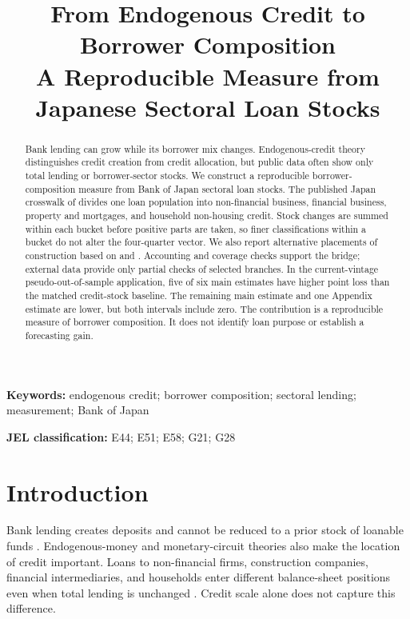 \documentclass[11pt]{article}
\title{From Endogenous Credit to Borrower Composition\\
\large A Reproducible Measure from Japanese Sectoral Loan Stocks}
\author{}
\date{}
\begin{document}
\maketitle

\begin{abstract}
Bank lending can grow while its borrower mix changes. Endogenous-credit theory
distinguishes credit creation from credit allocation, but public data often
show only total lending or borrower-sector stocks. We construct a reproducible
borrower-composition measure from Bank of Japan sectoral loan stocks. The
published Japan crosswalk of \citet{BezemerSamarinaZhang2020} divides one loan
population into non-financial business, financial business, property and
mortgages, and household non-housing credit. Stock changes are summed within
each bucket before positive parts are taken, so finer classifications within a
bucket do not alter the four-quarter vector. We also report alternative
placements of construction based on \citet{Werner1997} and
\citet{MullerVerner2024}. Accounting and coverage checks support the bridge;
external data provide only partial checks of selected branches. In the
current-vintage pseudo-out-of-sample application, five of six main estimates
have higher point loss than the matched credit-stock baseline. The remaining
main estimate and one Appendix estimate are lower, but both intervals include
zero. The contribution is a reproducible measure of borrower composition. It
does not identify loan purpose or establish a forecasting gain.
\end{abstract}

\noindent\textbf{Keywords:} endogenous credit; borrower composition; sectoral
lending; measurement; Bank of Japan

\medskip
\noindent\textbf{JEL classification:} E44; E51; E58; G21; G28

\section{Introduction}

Bank lending creates deposits and cannot be reduced to a prior stock of
loanable funds \citep{LeBourva1992,Fontana2003,BoE2014}. Endogenous-money and
monetary-circuit theories also make the location of credit important. Loans to
non-financial firms, construction companies, financial intermediaries, and
households enter different balance-sheet positions even when total lending is
unchanged \citep{RochonRossi2007,Passarella2014,Werner2012}. Credit scale alone
does not capture this difference.
\end{document}
